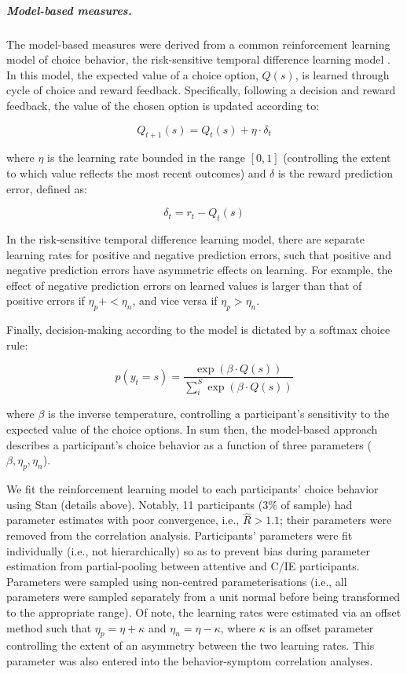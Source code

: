 \documentclass[a4paper,notitlepage,12pt]{article}
\begin{document}
\subparagraph{Model-based measures.} The model-based measures were derived from a common reinforcement learning model of choice behavior, the risk-sensitive temporal difference learning model \cite{niv2012neural}. In this model, the expected value of a choice option, $Q(s)$, is learned through cycle of choice and reward feedback. Specifically, following a decision and reward feedback, the value of the chosen option is updated according to:

\begin{equation*}
    Q_{t+1}(s) = Q_{t}(s) + \eta \cdot \delta_{t}
\end{equation*}

where $\eta$ is the learning rate bounded in the range $[0,1]$ (controlling the extent to which value reflects the most recent outcomes) and $\delta$ is the reward prediction error, defined as:

\begin{equation*}
    \delta_t = r_t - Q_{t}(s)
\end{equation*}

In the risk-sensitive temporal difference learning model, there are separate learning rates for positive and negative prediction errors, such that positive and negative prediction errors have asymmetric effects on learning. For example, the effect of negative prediction errors on learned values is larger than that of positive errors if $\eta_p+ < \eta_n$, and vice versa if $\eta_p > \eta_n$.

Finally, decision-making according to the model is dictated by a softmax choice rule:

\begin{equation*}
    p(y_t = s) = \frac{\exp \left( \beta \cdot Q(s) \right)}{\sum_i^S \exp \left( \beta \cdot Q(s) \right)}
\end{equation*}

where $\beta$ is the inverse temperature, controlling a participant's sensitivity to the expected value of the choice options. In sum then, the model-based approach describes a participant's choice behavior as a function of three parameters ($\beta, \eta_p, \eta_n$). 

We fit the reinforcement learning model to each participants' choice behavior using Stan (details above). Notably, 11 participants (3\% of sample) had parameter estimates with poor convergence, i.e., $\hat{R} > 1.1$; their parameters were removed from the correlation analysis. Participants' parameters were fit individually (i.e., not hierarchically) so as to prevent bias during parameter estimation from partial-pooling between attentive and C/IE participants. Parameters were sampled using non-centred parameterisations (i.e., all parameters were sampled separately from a unit normal before being transformed to the appropriate range). Of note, the learning rates were estimated via an offset method such that $\eta_p = \eta + \kappa$ and $\eta_n = \eta - \kappa$, where $\kappa$ is an offset parameter controlling the extent of an asymmetry between the two learning rates. This parameter was also entered into the behavior-symptom correlation analyses. 
\end{document}
